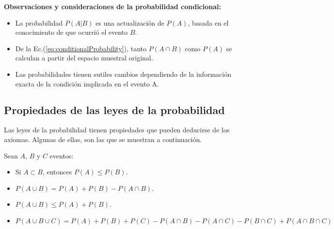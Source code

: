 \def\firsttcircle{(90:1.75cm) circle (1.5cm)}
\def\seconddcircle{(170:1.75cm) circle (1.5cm)}
\def\thirddcircle{(-25:2cm) circle (1.5cm)}
\begin{figure}
    \centering
{}
\end{figure}

\textbf{Observaciones y consideraciones de la probabilidad condicional:}

\begin{itemize}
\item La probabilidad $P(A|B)$ es una actualización de $P(A)$, basada en el
conocimiento de que ocurrió el evento $B$.

\item De la Ec.(\ref{eq:conditionalProbability}), tanto $P(A \cap B)$ como
$P(A)$ se calculan a partir del espacio muestral original.

\item Las probabilidades tienen sutiles cambios dependiendo de la información
exacta de la condición implicada en el evento A.
\end{itemize}

\subsection{Propiedades de las leyes de la probabilidad}

Las leyes de la probabilidad tienen propiedades que pueden deducirse de los
axiomas. Algunas de ellas, son las que se muestran a continuación.

\begin{tcolorbox}[colback=blue!5!white,colframe=blue!60!black,title=Resumen: Propiedades de las leyes de la probabilidad]
    Sean $A$, $B$ y $C$ eventos:

    \begin{itemize}
        \item Si $A \subset B$, entonces $P(A) \leq P(B)$.
        
        \item $P(A \cup B) = P(A) + P(B) - P(A \cap B)$.

        \item $P(A \cup B) \leq P(A) + P(B)$.

    \item $P(A \cup B \cup C) = P(A) + P(B) + P(C) - P(A \cap B) - P(A \cap C) - P(B
        \cap C) + P(A \cap B \cap C)$
    \end{itemize}
\end{tcolorbox}

